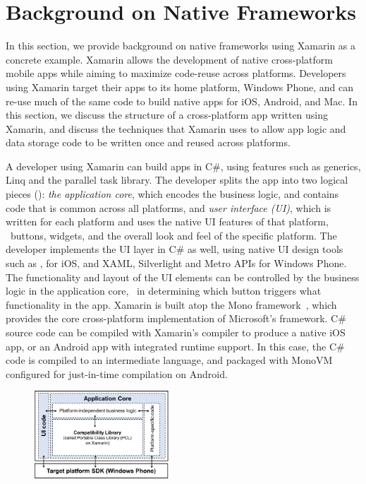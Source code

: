 \section{Background on Native Frameworks}
\label{section:background}

In this section, we provide background on native frameworks using Xamarin as a
concrete example.  Xamarin allows the development of native cross-platform
mobile apps while aiming to maximize code-reuse across platforms. Developers
using Xamarin target their apps to its home platform, Windows Phone, and can
re-use much of the same code to build native apps for iOS, Android, and Mac. In
this section, we discuss the structure of a cross-platform app written using
Xamarin, and discuss the techniques that Xamarin uses to allow app logic and
data storage code to be written once and reused across platforms.

A developer using Xamarin can build apps in C\#, using features such as
generics, Linq and the parallel task library. The developer splits the app into
two logical pieces (): \textit{the application core},
which encodes the business logic, and contains code that is common across all
platforms, and \textit{user interface (UI)}, which is written for each platform
and uses the native UI features of that platform, \eg~buttons, widgets, and the
overall look and feel of the specific platform. The developer implements the UI
layer in C\# as well, using native UI design tools such as
,  for iOS, and XAML, Silverlight and
Metro APIs for Windows Phone. The functionality and layout of the UI elements
can be controlled by the business logic in the application core, \eg~in
determining which button triggers what functionality in the app.  Xamarin is
built atop the Mono  framework~\cite{mono}, which provides the core
cross-platform implementation of Microsoft's  framework. C\# source
code can be compiled with Xamarin's compiler to produce a native iOS app, or an
Android app with integrated  runtime support. In this case, the C\#
code is compiled to an intermediate language, and packaged with MonoVM
configured for just-in-time compilation on Android.

\begin{figure}[t!]
\centering
\includegraphics[keepaspectratio=true,width=0.45\textwidth]{figures/appstruct.png}
{\label{figure:appstruct}}
\end{figure}

